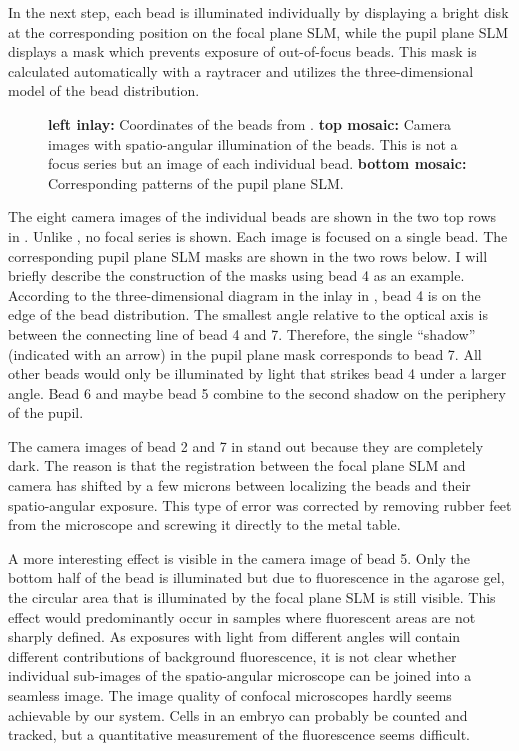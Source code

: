 In the next step, each bead is illuminated individually by displaying
a bright disk at the corresponding position on the focal plane SLM,
while the pupil plane SLM displays a mask which prevents
exposure of out-of-focus beads. This mask is calculated automatically
with a raytracer and utilizes the three-dimensional model of the bead
distribution.


\begin{figure}[hbtp]
  \centering
  \caption{{\bf left inlay:} Coordinates of the beads from
    . {\bf top mosaic:} Camera images with
    spatio-angular illumination of the beads. This is not a focus
    series but an image of each individual bead. {\bf bottom mosaic:}
    Corresponding patterns of the pupil plane SLM.}
  \label{fig:m_ang}
\end{figure}

The eight camera images of the individual beads are shown in the two
top rows in . Unlike , no focal
series is shown. Each image is focused on a single bead. The
corresponding pupil plane SLM masks are shown in the two rows below. I
will briefly describe  the
construction of the masks using bead 4 as an example. According to the
three-dimensional diagram in the inlay in , bead 4 is
on the edge of the bead distribution. The smallest angle relative to
the optical axis is between the connecting line of bead 4 and
7. Therefore, the single ``shadow'' (indicated with an arrow) in the
pupil plane mask corresponds to bead 7. All other beads would only be
illuminated by light that strikes bead 4 under a larger angle. Bead 6
and maybe bead 5 combine to the second shadow on the periphery of the
pupil.

The  camera images of bead 2 and 7 in
 stand out because they are completely dark. The
reason is that the registration between the focal plane SLM and camera
has shifted by a few microns between localizing the beads and their
spatio-angular exposure. This type of error was corrected by removing
rubber feet from the microscope and screwing it directly to the metal
table.

 

A  more interesting effect is visible in the camera
image of bead 5. Only the bottom half of the bead is illuminated but
due to fluorescence in the agarose gel, the circular area that is
illuminated by the focal plane SLM is still visible. This effect would
predominantly occur in samples where fluorescent areas are not sharply
defined. As exposures with light from different angles will contain
different contributions of background fluorescence, it is not clear
whether individual sub-images of the spatio-angular microscope can be
joined into a seamless image. The image quality of confocal
microscopes hardly seems achievable by our system. Cells in an embryo can probably
be counted and tracked, but a quantitative measurement of the
fluorescence seems difficult.

